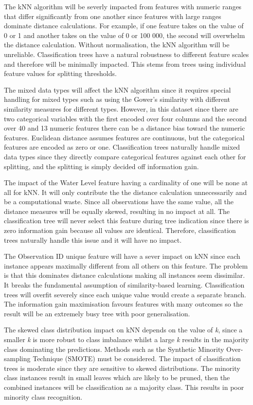 \documentclass[conference]{IEEEtran}
\begin{document}
The kNN algorithm will be severly impacted from features with numeric ranges that differ significantly from one another since features with large ranges dominate distance calculations. For example, if one feature takes on the value of 0 or 1 and another takes on the value of 0 or 100 000, the second will overwhelm the distance calculation. Without normalisation, the kNN algorithm will be unreliable. Classification trees have a natural robustness to different feature scales and therefore will be minimally impacted. This stems from trees using individual feature values for splitting thresholds.

The mixed data types will affect the kNN algorithm since it requires special handling for mixed types such as using the Gower's similarity with different similarity measures for different types. However, in this dataset since there are two categorical variables with the first encoded over four columns and the second over 40 and 13 numeric features there can be a distance bias toward the numeric features. Euclidean distance assumes features are continuous, but the categorical features are encoded as zero or one. Classification trees naturally handle mixed data types since they directly compare categorical features against each other for splitting, and the splitting is simply decided off information gain.

The impact of the Water Level feature having a cardinality of one will be none at all for kNN. It will only contribute the the distance calculation unnecessarily and be a computational waste. Since all observations have the same value, all the distance measures will be equally skewed, resulting in no impact at all. The classification tree will never select this feature during tree indication since there is zero information gain because all values are identical. Therefore, classification trees naturally handle this issue and it will have no impact.

The Observation ID unique feature will have a sever impact on kNN since each instance appears maximally different from all others on this feature. The problem is that this dominates distance calculations making all instances seem dissimilar. It breaks the fundamental assumption of similarity-based learning. Classification trees will overfit severely since each unique value would create a separate branch. The information gain maximisation favours features with many outcomes so the result will be an extremely busy tree with poor generalisation.

The skewed class distribution impact on kNN depends on the value of \textit{k}, since a smaller \textit{k} is more robust to class imbalance whilst a large \textit{k} results in the majority class dominating the predictions. Methods such as the Synthetic Minority Over-sampling Technique (SMOTE) must be considered. The impact of classification trees is moderate since they are sensitive to skewed distributions. The minority class instances result in small leaves which are likely to be pruned, then the combined instances will be classification as a majority class. This results in poor minority class recognition.
\end{document}

